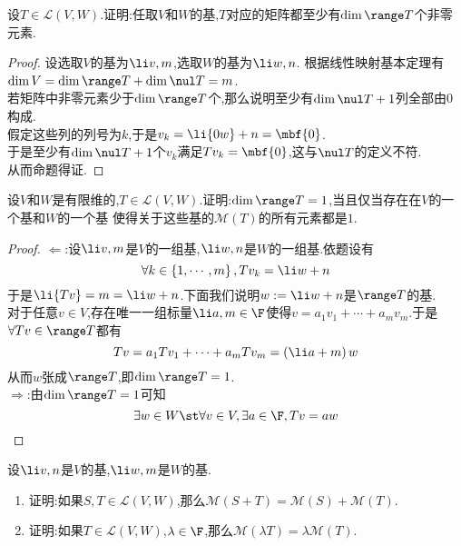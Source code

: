 \documentclass{ctexart}
\begin{document}
\pagestyle{empty}
\begin{problem}[1.]
    设$T\in\mathcal{L}(V,W)$.证明:任取$V$和$W$的基,$T$对应的矩阵都至少有$\dim\range T$个非零元素.
\end{problem}
\begin{proof}
    设选取$V$的基为$\li v,m$,选取$W$的基为$\li w,n$.
    根据线性映射基本定理有$\dim V=\dim\range T+\dim\nul T=m$.\\
    若矩阵中非零元素少于$\dim\range T$个,那么说明至少有$\dim\nul T+1$列全部由$0$构成.\\
    假定这些列的列号为$k$,于是$v_k=\li {0w}+n=\mbf{0}$.\\
    于是至少有$\dim\nul T+1$个$v_k$满足$Tv_k=\mbf{0}$,这与$\nul T$的定义不符.\\
    从而命题得证.
\end{proof}
\begin{problem}[3.]
    设$V$和$W$是有限维的,$T\in\mathcal{L}(V,W)$.证明:$\dim\range T=1$,当且仅当存在在$V$的一个基和$W$的一个基
    使得关于这些基的$\mathcal{M}(T)$的所有元素都是$1$.
\end{problem}
\begin{proof}
    $\Leftarrow$:设$\li v,m$是$V$的一组基,$\li w,n$是$W$的一组基.依题设有
    $$\forall k\in\left\{1,\cdots,m\right\},Tv_k=\li w+n$$
    于是$\li {Tv}=m=\li w+n$.下面我们说明$w:=\li w+n$是$\range T$的基.\\
    对于任意$v\in V$,存在唯一一组标量$\li a,m\in\F$使得$v=a_1v_1+\cdots+a_mv_m$.于是$\forall Tv\in\range T$都有
    $$Tv=a_1Tv_1+\cdots+a_mTv_m=\left(\li a+m\right)w$$
    从而$w$张成$\range T$,即$\dim\range T=1$.\\
    $\Rightarrow$:由$\dim\range T=1$可知
    $$\exists w\in W\st\forall v\in V,\exists a\in\F,Tv=aw$$
    
\end{proof}
\begin{problem}[3.]
    设$\li v,n$是$V$的基,$\li w,m$是$W$的基.
    \begin{enumerate}[label=\tbf{(\arabic*)}]
        \item 证明:如果$S,T\in\mathcal{L}(V,W)$,那么$\mathcal{M}(S+T)=\mathcal{M}(S)+\mathcal{M}(T)$.
        \item 证明:如果$T\in\mathcal{L}(V,W)$,$\lambda\in\F$,那么$\mathcal{M}(\lambda T)=\lambda\mathcal{M}(T)$.
    \end{enumerate}
\end{problem}
\end{document}
